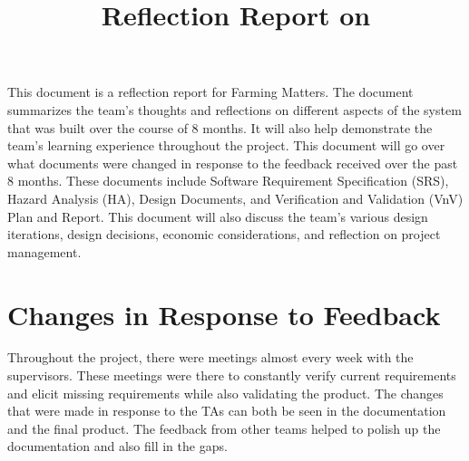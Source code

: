 \documentclass{article}
\title{Reflection Report on \progname}
\author{\authname}
\date{}
\begin{document}
\maketitle



This document is a reflection report for Farming Matters. The document summarizes the team's thoughts and reflections on different aspects of the system that was built over the course of 8 months. It will also help demonstrate the team's learning experience throughout the project. This document will go over what documents were changed in response to the feedback received over the past 8 months. These documents include Software Requirement Specification (SRS), Hazard Analysis (HA), Design Documents, and Verification and Validation (VnV) Plan and Report. This document will also discuss the team's various design iterations, design decisions, economic considerations, and reflection on project management.

\section{Changes in Response to Feedback}



Throughout the project, there were meetings almost every week with the supervisors. These meetings were there to constantly verify current requirements and elicit missing requirements while also validating the product. The changes that were made in response to the TAs can both be seen in the documentation and the final product. The feedback from other teams helped to polish up the documentation and also fill in the gaps.  
\end{document}
